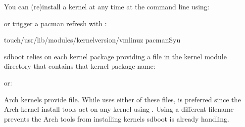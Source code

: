 \documentclass[letterpaper,11pt,english]{sphinxmanual}
\begin{document}
\sphinxAtStartPar
You can (re\sphinxhyphen{})install a kernel at any time at the command line using:

\begin{sphinxVerbatim}[commandchars=\\\{\}]
   
\end{sphinxVerbatim}

\sphinxAtStartPar
or trigger a pacman refresh with :

\begin{sphinxVerbatim}[commandchars=\\\{\}]
touch/usr/lib/modules/\PYGZlt{}kernel\PYGZhy{}version\PYGZgt{}/vmlinuz
pacman\PYGZhy{}Syu
\end{sphinxVerbatim}

\sphinxAtStartPar
sd\sphinxhyphen{}boot relies on each kernel package providing a file in the kernel module
directory that contains that kernel package name:

\begin{sphinxVerbatim}[commandchars=\\\{\}]
\end{sphinxVerbatim}

\sphinxAtStartPar
or:

\begin{sphinxVerbatim}[commandchars=\\\{\}]
\end{sphinxVerbatim}

\sphinxAtStartPar
Arch kernels provide  file.
While  uses either of these files,  is preferred
since the Arch kernel install tools act on any kernel using .
Using a different filename prevents the Arch tools from installing kernels
sd\sphinxhyphen{}boot is already handling.
\end{document}

